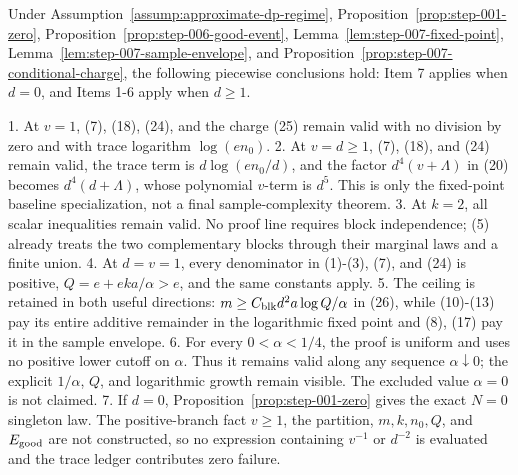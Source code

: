 \begin{proposition}\label{prop:step-007-boundaries}
Under Assumption~\ref{assump:approximate-dp-regime}, Proposition~\ref{prop:step-001-zero},
Proposition~\ref{prop:step-006-good-event},
Lemma~\ref{lem:step-007-fixed-point},
Lemma~\ref{lem:step-007-sample-envelope}, and
Proposition~\ref{prop:step-007-conditional-charge}, the following
piecewise conclusions hold: Item 7 applies when \(d=0\), and Items 1-6
apply when \(d\ge1\).

1. At \(v=1\), (7), (18), (24), and the charge (25) remain valid with no
   division by zero and with trace logarithm \(\log(en_0)\).
2. At \(v=d\ge1\), (7), (18), and (24) remain valid, the trace term is
   \(d\log(en_0/d)\), and the factor \(d^4(v+\Lambda)\) in (20) becomes
   \(d^4(d+\Lambda)\), whose polynomial \(v\)-term is \(d^5\). This is only
   the fixed-point baseline specialization, not a final sample-complexity
   theorem.
3. At \(k=2\), all scalar inequalities remain valid. No proof line requires
   block independence;  (5) already treats the two complementary
   blocks through their marginal laws and a finite union.
4. At \(d=v=1\), every denominator in (1)-(3), (7), and (24) is positive,
   \(Q=e+eka/\alpha>e\), and the same constants apply.
5. The ceiling is retained in both useful directions:
   \(m\ge C_{\rm blk}d^2a\log Q/\alpha\) in (26), while (10)-(13) pay its
   entire additive remainder in the logarithmic fixed point and (8), (17)
   pay it in the sample envelope.
6. For every \(0<\alpha<1/4\), the proof is uniform and uses no positive
   lower cutoff on \(\alpha\). Thus it remains valid along any sequence
   \(\alpha\downarrow0\); the explicit \(1/\alpha\), \(Q\), and logarithmic
   growth remain visible. The excluded value \(\alpha=0\) is not claimed.
7. If \(d=0\), Proposition~\ref{prop:step-001-zero} gives the exact
   \(N=0\) singleton law. The positive-branch fact \(v\ge1\), the partition,
   \(m,k,n_0,Q\), and \(E_{\rm good}\) are not constructed, so no expression
   containing \(v^{-1}\) or \(d^{-2}\) is evaluated and the trace ledger
   contributes zero failure.


\end{proposition}

